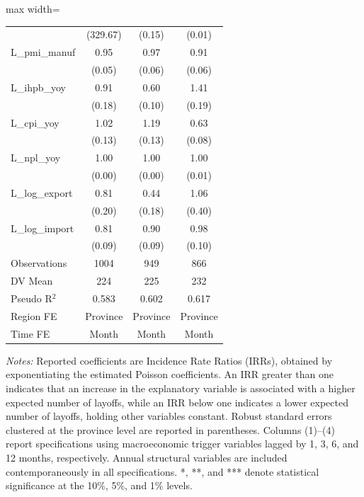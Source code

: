 \begin{table}[H]
\begin{adjustbox}{max width=\textwidth}
\begin{tabular}{l*{3}{c}}
            &    (329.67)         &      (0.15)         &      (0.01)         \\
L\_pmi\_manuf &        0.95         &        0.97         &        0.91         \\
            &      (0.05)         &      (0.06)         &      (0.06)         \\
L\_ihpb\_yoy  &        0.91         &        0.60\sym{**} &        1.41\sym{*}  \\
            &      (0.18)         &      (0.10)         &      (0.19)         \\
L\_cpi\_yoy   &        1.02         &        1.19         &        0.63\sym{***}\\
            &      (0.13)         &      (0.13)         &      (0.08)         \\
L\_npl\_yoy   &        1.00         &        1.00         &        1.00         \\
            &      (0.00)         &      (0.00)         &      (0.01)         \\
L\_log\_export&        0.81         &        0.44         &        1.06         \\
            &      (0.20)         &      (0.18)         &      (0.40)         \\
L\_log\_import&        0.81\sym{*}  &        0.90         &        0.98         \\
            &      (0.09)         &      (0.09)         &      (0.10)         \\
\midrule
Observations&        1004         &         949         &         866         \\
DV Mean     &         224         &         225         &         232         \\
Pseudo R$^2$&       0.583         &       0.602         &       0.617         \\
Region FE   &    Province         &    Province         &    Province         \\
Time FE     &       Month         &       Month         &       Month         \\
\bottomrule
\end{tabular}
\end{adjustbox}
\begin{tablenotes}
\footnotesize
\item \textit{Notes:} Reported coefficients are Incidence Rate Ratios (IRRs), obtained by exponentiating the estimated Poisson coefficients. An IRR greater than one indicates that an increase in the explanatory variable is associated with a higher expected number of layoffs, while an IRR below one indicates a lower expected number of layoffs, holding other variables constant. Robust standard errors clustered at the province level are reported in parentheses. Columns (1)--(4) report specifications using macroeconomic trigger variables lagged by 1, 3, 6, and 12 months, respectively. Annual structural variables are included contemporaneously in all specifications. *, **, and *** denote statistical significance at the 10\%, 5\%, and 1\% levels.
\end{tablenotes}
\end{table}
